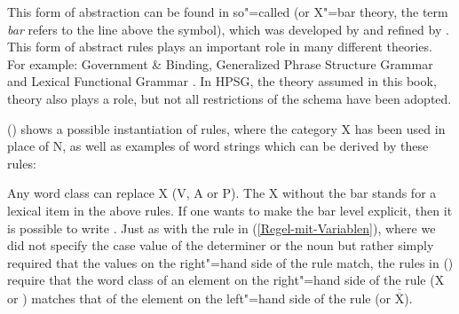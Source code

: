 This form of abstraction can be found in so"=called \xbart (or X"=bar theory, the term \emph{bar}
refers to the line above the symbol), which was developed by \citet{Chomsky70a} and refined by
\citet{Jackendoff77a}. This form of abstract rules plays an important role in many different
theories. For example: Government \& Binding\indexgb \citep{Chomsky81a}, Generalized Phrase
Structure Grammar\indexgpsg \citep{GKPS85a,Uszkoreit87a} and Lexical Functional Grammar\indexlfg
\citep{Bresnan82a-ed,BATW2016a}. In HPSG\indexhpsg, the theory assumed in this book, \xbar theory also plays
a role, but not all restrictions of the \xbar schema have been adopted.

() shows a possible instantiation of \xbar rules, where the category X has been used in place of N, as well as examples of word strings
which can be derived by these rules:
\eanoraggedright
\label{psg-xbar-schema}
\z

Any word class can replace X (\eg V, A or P). The X without the bar stands for a lexical item in
the above rules. If one wants to make the bar level explicit, then it is possible to write \xnull. 
Just as with the rule in (\ref{Regel-mit-Variablen}), where we did not specify the case value of the
determiner or the noun but rather simply required that the values on the right"=hand side of the
rule match, the rules in () require that the word class of an element on the right"=hand side
of the rule (X or \xbar) matches that of the element on the left"=hand side of the rule (\xbar or
$\overline{\overline{\mbox{X}}}$).

